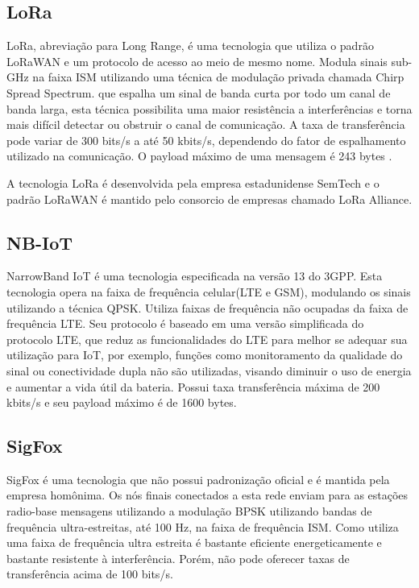 \subsection{LoRa}
LoRa, abreviação para Long Range, é uma tecnologia que utiliza o padrão LoRaWAN e um protocolo de acesso ao meio de mesmo nome. Modula sinais sub-GHz na faixa ISM utilizando uma técnica de modulação  privada chamada Chirp Spread Spectrum. que espalha um sinal de banda curta por todo um canal de banda larga, esta técnica possibilita uma maior resistência a interferências e torna mais difícil detectar ou obstruir o canal de comunicação. A taxa de transferência pode variar de 300 bits/s a até 50 kbits/s, dependendo do fator de espalhamento utilizado na comunicação. O payload máximo de uma mensagem é 243 bytes \cite{mekki2019comparative}.

A tecnologia LoRa é desenvolvida pela empresa estadunidense SemTech e o padrão LoRaWAN é mantido pelo consorcio de empresas chamado LoRa Alliance.

\subsection{NB-IoT}
NarrowBand IoT é uma tecnologia especificada na versão 13 do 3GPP. Esta tecnologia opera na faixa de frequência celular(LTE e GSM), modulando os sinais utilizando a técnica QPSK. Utiliza faixas de frequência não ocupadas da faixa de frequência LTE. Seu protocolo é baseado em uma versão simplificada do protocolo LTE, que reduz as funcionalidades do LTE para melhor se adequar sua utilização para IoT, por exemplo, funções como monitoramento da qualidade do sinal ou conectividade dupla não são utilizadas, visando diminuir o uso de energia e aumentar a vida útil da bateria. Possui taxa transferência máxima de 200 kbits/s e seu payload máximo é de 1600 bytes.

\subsection{SigFox}
SigFox é uma tecnologia que não possui padronização oficial e é mantida pela empresa homônima. Os nós finais conectados a esta rede enviam para as estações radio-base mensagens utilizando a modulação BPSK utilizando bandas de frequência ultra-estreitas, até 100 Hz, na faixa de frequência ISM. Como utiliza uma faixa de frequência ultra estreita é bastante eficiente energeticamente e bastante resistente à interferência. Porém, não pode oferecer taxas de transferência acima de 100 bits/s.

